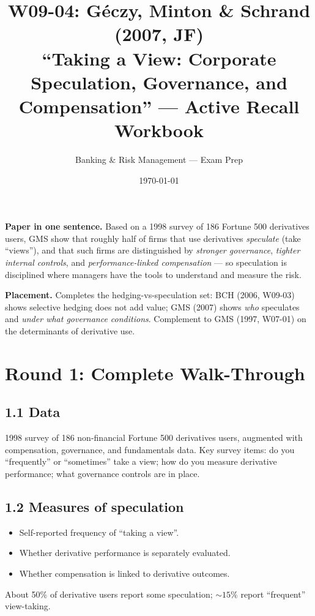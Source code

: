 \documentclass[11pt]{article}
\title{W09-04: Géczy, Minton \& Schrand (2007, JF) \\
\large ``Taking a View: Corporate Speculation, Governance, and Compensation'' --- Active Recall Workbook}
\author{Banking \& Risk Management --- Exam Prep}
\date{\today}
\begin{document}
\maketitle

\begin{keybox}
\textbf{Paper in one sentence.} Based on a 1998 survey of 186 Fortune 500 derivatives users, GMS show that roughly half of firms that use derivatives \emph{speculate} (take ``views''), and that such firms are distinguished by \emph{stronger governance}, \emph{tighter internal controls}, and \emph{performance-linked compensation} --- so speculation is disciplined where managers have the tools to understand and measure the risk.

\textbf{Placement.} Completes the hedging-vs-speculation set: BCH (2006, W09-03) shows selective hedging does not add value; GMS (2007) shows \emph{who} speculates and \emph{under what governance conditions}. Complement to GMS (1997, W07-01) on the determinants of derivative use.
\end{keybox}

\section*{Round 1: Complete Walk-Through}

\subsection*{1.1 Data}
1998 survey of 186 non-financial Fortune 500 derivatives users, augmented with compensation, governance, and fundamentals data. Key survey items: do you ``frequently'' or ``sometimes'' take a view; how do you measure derivative performance; what governance controls are in place.

\subsection*{1.2 Measures of speculation}
\begin{itemize}
\item Self-reported frequency of ``taking a view''.
\item Whether derivative performance is separately evaluated.
\item Whether compensation is linked to derivative outcomes.
\end{itemize}
About 50\% of derivative users report some speculation; $\sim 15\%$ report ``frequent'' view-taking.
\end{document}
